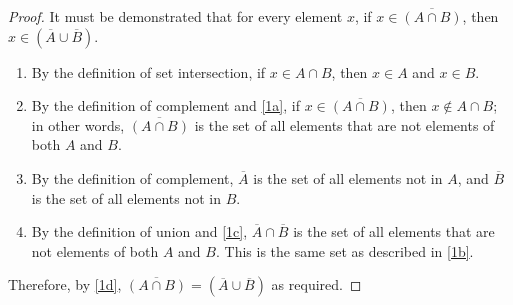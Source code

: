 \begin{proof} It must be demonstrated that for every element $x$, if $x \in \overline{(A \cap B)}$, then $ x \in (\overline{A} \cup \overline{B}) $.
	\begin{enumerate}[label=\textbf{\Roman*}]
		\item \label{1a} By the definition of set intersection, if $ x \in A \cap B $, then $ x \in A $ and $ x \in B $.
		\item \label{1b} By the definition of complement and \ref{1a}, if $ x \in \overline{(A \cap B)} $, then $ x \notin A \cap B $; in other words, $ \overline{(A \cap B)} $ is the set of all elements that are not elements of both $ A $ and $ B $.
		\item \label{1c} By the definition of complement, $ \overline{A} $ is the set of all elements not in $ A $, and $\overline{B} $ is the set of all elements not in $ B $.
		\item \label{1d} By the definition of union and \ref{1c}, $ \overline{A} \cap \overline{B} $ is the set of all elements that are not elements of both $ A $ and $ B $. This is the same set as described in \ref{1b}.
	\end{enumerate}
	Therefore, by \ref{1d}, $ \overline{(A \cap B)} = (\overline{A} \cup \overline{B}) $ as required.
\end{proof}